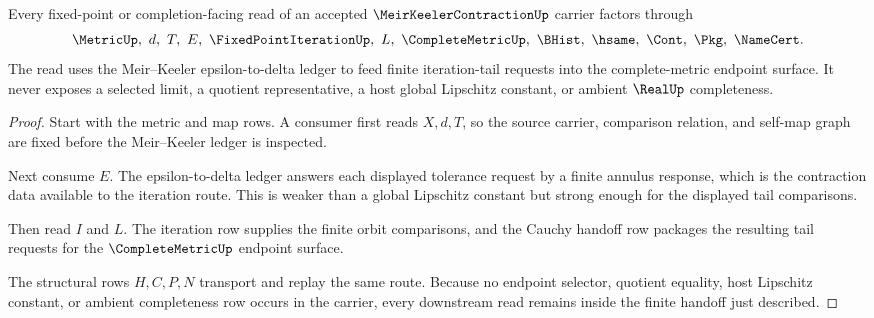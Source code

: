 \begin{theorem}
\label{thm:meir-keeler-contraction-cauchy-handoff}
Every fixed-point or completion-facing read of an accepted $\MeirKeelerContractionUp$ carrier factors through
$$
\MetricUp,\ d,\ T,\ E,\ \FixedPointIterationUp,\ L,\ \CompleteMetricUp,\ \BHist,\ \hsame,\ \Cont,\ \Pkg,\ \NameCert .
$$
The read uses the Meir--Keeler epsilon-to-delta ledger to feed finite iteration-tail requests into the complete-metric endpoint surface. It never exposes a selected limit, a quotient representative, a host global Lipschitz constant, or ambient $\RealUp$ completeness.
\end{theorem}
\begin{proof}
Start with the metric and map rows. A consumer first reads $X,d,T$, so the source carrier, comparison relation, and self-map graph are fixed before the Meir--Keeler ledger is inspected.

Next consume $E$. The epsilon-to-delta ledger answers each displayed tolerance request by a finite annulus response, which is the contraction data available to the iteration route. This is weaker than a global Lipschitz constant but strong enough for the displayed tail comparisons.

Then read $I$ and $L$. The iteration row supplies the finite orbit comparisons, and the Cauchy handoff row packages the resulting tail requests for the $\CompleteMetricUp$ endpoint surface.

The structural rows $H,C,P,N$ transport and replay the same route. Because no endpoint selector, quotient equality, host Lipschitz constant, or ambient completeness row occurs in the carrier, every downstream read remains inside the finite handoff just described.
\end{proof}



